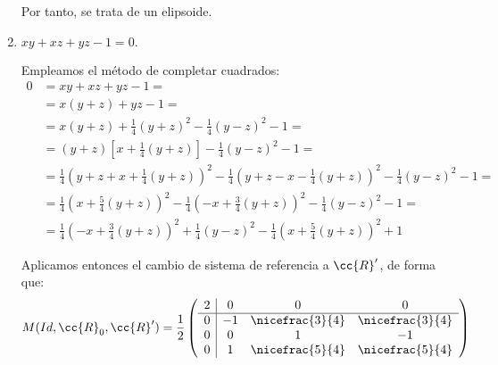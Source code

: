 \begin{ejercicio}
\begin{enumerate}
        Por tanto, se trata de un elipsoide.
        \item $xy + xz + yz - 1 = 0.$

        Empleamos el método de completar cuadrados:
        \begin{equation*}
            \begin{split}
                0 &= xy + xz + yz - 1=\\
                &= x(y+z) +yz -1 =\\
                &= x(y+z) + \frac{1}{4}(y+z)^2 - \frac{1}{4}(y-z)^2 -1=\\
                &= (y+z)\left[x + \frac{1}{4}(y+z)\right] - \frac{1}{4}(y-z)^2-1 =\\
                &= \frac{1}{4}\left(y+z+x+\frac{1}{4}(y+z)\right)^2 - \frac{1}{4}\left(y+z-x-\frac{1}{4}(y+z)\right)^2 - \frac{1}{4}(y-z)^2-1 =\\
                &= \frac{1}{4}\left(x+\frac{5}{4}(y+z)\right)^2 - \frac{1}{4}\left(-x+\frac{3}{4}(y+z)\right)^2 - \frac{1}{4}(y-z)^2-1 =\\
                &= \frac{1}{4}\left(-x+\frac{3}{4}(y+z)\right)^2 + \frac{1}{4}(y-z)^2 -\frac{1}{4}\left(x+\frac{5}{4}(y+z)\right)^2+1
            \end{split}
        \end{equation*}

        Aplicamos entonces el cambio de sistema de referencia a $\cc{R}'$, de forma que:
        \begin{equation*}
            M(Id, \cc{R}_0, \cc{R}') = \frac{1}{2}\left(\begin{array}{c|ccc}
                2 & 0 & 0 & 0 \\ \hline
                0 & -1 & \nicefrac{3}{4} & \nicefrac{3}{4} \\
                0 & 0 & 1 & -1 \\
                0 & 1 & \nicefrac{5}{4} & \nicefrac{5}{4}
            \end{array}\right)
        \end{equation*}


\end{enumerate}
\end{ejercicio}
